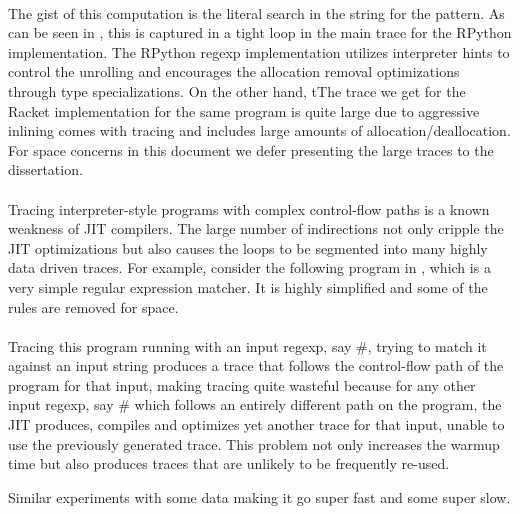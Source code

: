 			\paragraph{}%
			The gist of this computation is the literal search in the string for
			the  pattern. As can be seen in
			, this is captured in a tight loop in the
			main trace for the RPython implementation. The RPython regexp
			implementation utilizes interpreter hints to control the unrolling and
			encourages the allocation removal optimizations through type
			specializations. On the other hand, tThe trace we get for the Racket
			implementation for the same program is quite large due to aggressive
			inlining comes with tracing and includes large amounts of
			allocation/deallocation. For space concerns in this document we defer
			presenting the large traces to the dissertation.

			\paragraph{}%
			Tracing interpreter-style programs with complex control-flow paths is
			a known weakness of JIT compilers. The large number of indirections
			not only cripple the JIT optimizations but also causes the loops to be
			segmented into many highly data driven traces. For
			example, consider the following program in , which
			is a very simple regular expression matcher. It is highly simplified
			and some of the rules are removed for space.

			\paragraph{}%
			Tracing this program running with an input regexp, say
			$\mathtt{\#}$, trying to match it against an
			input string produces a trace that follows the control-flow path of
			the program for that input, making tracing quite wasteful because for
			any other input regexp, say $\mathtt{\#}$ which
			follows an entirely different path on the program, the JIT produces,
			compiles and optimizes yet another trace for that input, unable to use
			the previously generated trace. This problem not only increases the
			warmup time but also produces traces that are unlikely to be
			frequently re-used.

			\begin{show-experiment}
				Similar experiments with some data making it go super fast and some super slow.
			\end{show-experiment}

